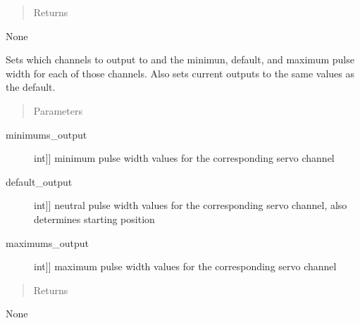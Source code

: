 \documentclass[letterpaper,10pt,english]{sphinxmanual}
\begin{document}
\begin{fulllineitems}
\begin{fulllineitems}
\begin{description}
\end{description}
\begin{quote}\begin{description}
\item[{Returns}] \leavevmode
\end{description}\end{quote}

\sphinxAtStartPar
None

\end{fulllineitems}


\begin{fulllineitems}
\label{\detokenize{base:MultiInputOutputObject.MultiInputOutputObject.set_outputs}}
\sphinxAtStartPar
Sets which channels to output to and the minimun, default, and maximum pulse width for each of those channels.
Also sets current outputs to the same values as the default.
\begin{quote}\begin{description}
\item[{Parameters}] \leavevmode
\end{description}\end{quote}
\begin{description}
\item[{minimums\_output}] \leavevmode{[}{[}int{]}{]}
\sphinxAtStartPar
minimum pulse width values for the corresponding servo channel

\item[{default\_output}] \leavevmode{[}{[}int{]}{]}
\sphinxAtStartPar
neutral pulse width values for the corresponding servo channel, also determines starting position

\item[{maximums\_output}] \leavevmode{[}{[}int{]}{]}
\sphinxAtStartPar
maximum pulse width values for the corresponding servo channel

\end{description}
\begin{quote}\begin{description}
\item[{Returns}] \leavevmode
\end{description}\end{quote}

\sphinxAtStartPar
None

\end{fulllineitems}


\end{fulllineitems}
\end{document}
